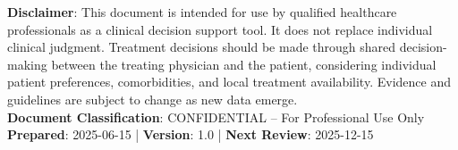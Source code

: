 \documentclass[10pt,letterpaper]{article}
\begin{document}
\vspace{6pt}

\begin{tcolorbox}[colback=highlightgray,colframe=black]
{\small
\textbf{Disclaimer}: This document is intended for use by qualified healthcare professionals as a clinical decision support tool. It does not replace individual clinical judgment. Treatment decisions should be made through shared decision-making between the treating physician and the patient, considering individual patient preferences, comorbidities, and local treatment availability. Evidence and guidelines are subject to change as new data emerge.\\[4pt]
\textbf{Document Classification}: CONFIDENTIAL -- For Professional Use Only\\
\textbf{Prepared}: 2025-06-15 | \textbf{Version}: 1.0 | \textbf{Next Review}: 2025-12-15
}
\end{tcolorbox}
\end{document}
